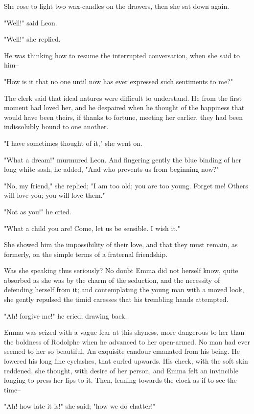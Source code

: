 \documentclass[11pt,twocolumn]{ltugboat}
\begin{document}
She rose to light two wax-candles on the drawers, then she sat down
again.

"Well!" said Leon.

"Well!" she replied.

He was thinking how to resume the interrupted conversation, when she
said to him--

"How is it that no one until now has ever expressed such sentiments to
me?"

The clerk said that ideal natures were difficult to understand. He from
the first moment had loved her, and he despaired when he thought of the
happiness that would have been theirs, if thanks to fortune, meeting her
earlier, they had been indissolubly bound to one another.

"I have sometimes thought of it," she went on.

"What a dream!" murmured Leon. And fingering gently the blue binding of
her long white sash, he added, "And who prevents us from beginning now?"

"No, my friend," she replied; "I am too old; you are too young. Forget
me! Others will love you; you will love them."

"Not as you!" he cried.

"What a child you are! Come, let us be sensible. I wish it."

She showed him the impossibility of their love, and that they must
remain, as formerly, on the simple terms of a fraternal friendship.

Was she speaking thus seriously? No doubt Emma did not herself know,
quite absorbed as she was by the charm of the seduction, and the
necessity of defending herself from it; and contemplating the young
man with a moved look, she gently repulsed the timid caresses that his
trembling hands attempted.

"Ah! forgive me!" he cried, drawing back.

Emma was seized with a vague fear at this shyness, more dangerous to her
than the boldness of Rodolphe when he advanced to her open-armed. No man
had ever seemed to her so beautiful. An exquisite candour emanated from
his being. He lowered his long fine eyelashes, that curled upwards.
His cheek, with the soft skin reddened, she thought, with desire of her
person, and Emma felt an invincible longing to press her lips to it.
Then, leaning towards the clock as if to see the time--

"Ah! how late it is!" she said; "how we do chatter!"
\end{document}
